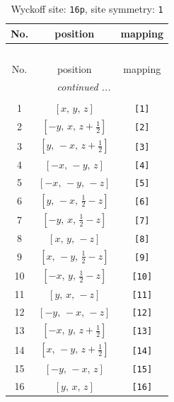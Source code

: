 \documentclass[fleqn,8pt]{jsarticle}
\begin{document}
\begin{longtable}{ccc}
\caption{Wyckoff site: {\tt 16p}, site symmetry: {\tt 1}}
 \\
 \hline \hline
No. & position & mapping \\ \hline \endfirsthead

\multicolumn{2}{l}{\tablename\ \thetable{}} \\
 \hline \hline
No. & position & mapping \\ \hline \endhead

 \hline \hline
\multicolumn{2}{r}{\footnotesize\it continued ...} \\ \endfoot

 \hline \hline
\multicolumn{2}{r}{} \\ \endlastfoot

1 & $\left[ x,\, y,\, z \right]$ & {\tt [1]} \\ \hline
2 & $\left[ - y,\, x,\, z + \frac{1}{2} \right]$ & {\tt [2]} \\ \hline
3 & $\left[ y,\, - x,\, z + \frac{1}{2} \right]$ & {\tt [3]} \\ \hline
4 & $\left[ - x,\, - y,\, z \right]$ & {\tt [4]} \\ \hline
5 & $\left[ - x,\, - y,\, - z \right]$ & {\tt [5]} \\ \hline
6 & $\left[ y,\, - x,\, \frac{1}{2} - z \right]$ & {\tt [6]} \\ \hline
7 & $\left[ - y,\, x,\, \frac{1}{2} - z \right]$ & {\tt [7]} \\ \hline
8 & $\left[ x,\, y,\, - z \right]$ & {\tt [8]} \\ \hline
9 & $\left[ x,\, - y,\, \frac{1}{2} - z \right]$ & {\tt [9]} \\ \hline
10 & $\left[ - x,\, y,\, \frac{1}{2} - z \right]$ & {\tt [10]} \\ \hline
11 & $\left[ y,\, x,\, - z \right]$ & {\tt [11]} \\ \hline
12 & $\left[ - y,\, - x,\, - z \right]$ & {\tt [12]} \\ \hline
13 & $\left[ - x,\, y,\, z + \frac{1}{2} \right]$ & {\tt [13]} \\ \hline
14 & $\left[ x,\, - y,\, z + \frac{1}{2} \right]$ & {\tt [14]} \\ \hline
15 & $\left[ - y,\, - x,\, z \right]$ & {\tt [15]} \\ \hline
16 & $\left[ y,\, x,\, z \right]$ & {\tt [16]} \\
\end{longtable}
\end{document}
